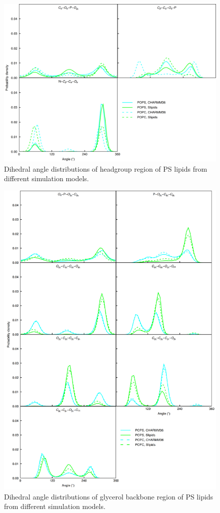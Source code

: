 \documentclass[journal=jpcbfk]{achemso}
\begin{document}
\begin{figure}[]
  \centering
  \includegraphics[width=16.0cm]{../Figs/figS7PC.png}
  \caption{\label{dihedralsHGpc}
    Dihedral angle distributions of headgroup region of PS lipids from different simulation models.
  }
\end{figure}

\begin{figure}[]
  \centering
  \includegraphics[width=15.0cm]{../Figs/figS6PC.png}
  \caption{\label{dihedralsGLYpc}
    Dihedral angle distributions of glycerol backbone region of PS lipids from different simulation models.
  }
\end{figure}
\end{document}
